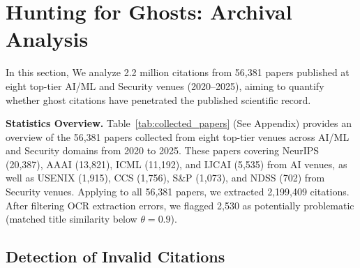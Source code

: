 \section{Hunting for Ghosts: Archival Analysis}
\label{sec:archival_results}

In this section, We analyze 2.2 million citations from 56,381 papers published at eight top-tier AI/ML and Security venues (2020--2025), aiming to quantify whether ghost citations have penetrated the published scientific record.

\noindent
\textbf{Statistics Overview.}
Table~\ref{tab:collected_papers} (See Appendix) provides an overview of the 56,381 papers collected from eight top-tier venues across AI/ML and Security domains from 2020 to 2025. These papers covering NeurIPS (20,387), AAAI (13,821), ICML (11,192), and IJCAI (5,535) from AI venues, as well as USENIX (1,915), CCS (1,756), S\&P (1,073), and NDSS (702) from Security venues. Applying \citeb to all 56,381 papers, we extracted 2,199,409 citations. After filtering OCR extraction errors, we flagged 2,530 as potentially problematic (matched title similarity below $\theta = 0.9$).

\subsection{Detection of Invalid Citations}

